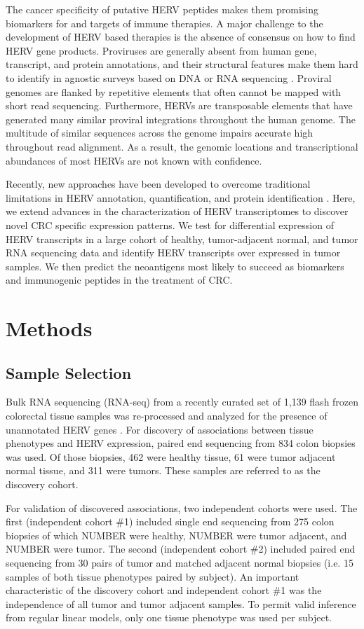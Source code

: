 \documentclass[11pt,letterpaper]{article}
\begin{document}
The cancer specificity of putative HERV peptides makes them promising biomarkers for and targets of immune therapies.
A major challenge to the development of HERV based therapies is the absence of consensus on how to find HERV gene products.
Proviruses are generally absent from human gene, transcript, and protein annotations, and their structural features make them hard to identify in agnostic surveys based on DNA or RNA sequencing \citep{ERVmap2018, Treangen2011}.
Proviral genomes are flanked by repetitive elements that often cannot be mapped with short read sequencing.
Furthermore, HERVs are transposable elements that have generated many similar proviral integrations throughout the human genome.
The multitude of similar sequences across the genome impairs accurate high throughout read alignment.
As a result, the genomic locations and transcriptional abundances of most HERVs are not known with confidence.

Recently, new approaches have been developed to overcome traditional limitations in HERV annotation, quantification, and protein identification \citep{Attig2017, Attig2019, ERVmap2018, Telescope2019}.
Here, we extend advances in the characterization of HERV transcriptomes to discover novel CRC specific expression patterns.
We test for differential expression of HERV transcripts in a large cohort of healthy, tumor-adjacent normal, and tumor RNA sequencing data and identify HERV transcripts over expressed in tumor samples.
We then predict the neoantigens most likely to succeed as biomarkers and immunogenic peptides in the treatment of CRC.

\section*{Methods}
\subsection*{Sample Selection}
Bulk RNA sequencing (RNA-seq) from a recently curated set of 1,139 flash frozen colorectal tissue samples was re-processed and analyzed for the presence of unannotated HERV genes \citep{Dampier2020}.
For discovery of associations between tissue phenotypes and HERV expression, paired end sequencing from 834 colon biopsies was used.
Of those biopsies, 462 were healthy tissue, 61 were tumor adjacent normal tissue, and 311 were tumors.
These samples are referred to as the discovery cohort.

For validation of discovered associations, two independent cohorts were used.
The first (independent cohort \#1) included single end sequencing from 275 colon biopsies of which NUMBER were healthy, NUMBER were tumor adjacent, and NUMBER were tumor.
The second (independent cohort \#2) included paired end sequencing from 30 pairs of tumor and matched adjacent normal biopsies (i.e. 15 samples of both tissue phenotypes paired by subject).
An important characteristic of the discovery cohort and independent cohort \#1 was the independence of all tumor and tumor adjacent samples.
To permit valid inference from regular linear models, only one tissue phenotype was used per subject.
\end{document}
